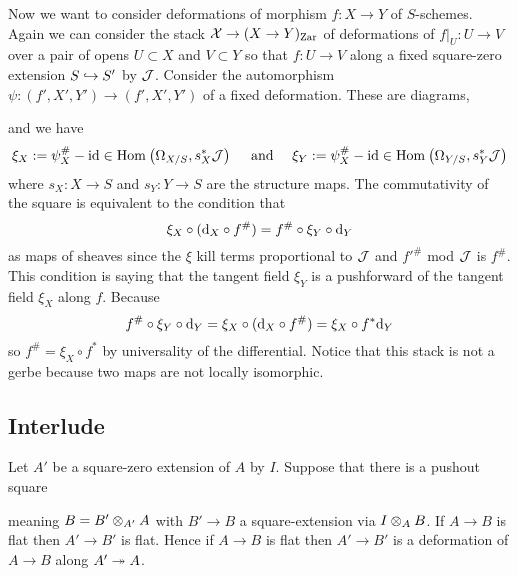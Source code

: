 \documentclass[12pt]{article}
\newcommand{\Zar}{\mathrm{Zar}}
\begin{document}
Now we want to consider deformations of morphism $f : X \to Y$ of $S$-schemes. Again we can consider the stack $\X \to (X \to Y)_{\Zar}$ of deformations of $f|_U : U \to V$ over a pair of opens $U \subset X$ and $V \subset Y$ so that $f : U \to V$ along a fixed square-zero extension $S \hookrightarrow S'$ by $\mathcal{J}$. Consider the automorphism $\psi : (f', X', Y') \to (f', X', Y')$ of a fixed deformation. These are diagrams,
\begin{center}
\end{center}
and we have
\[ \xi_X := \psi^{\#}_X - \mathrm{id} \in \mathrm{Hom}_{} \left( \Omega_{X/S}, s_X^* \mathcal{J} \right) \quad \text{ and } \quad \xi_Y := \psi^{\#}_X - \mathrm{id} \in \mathrm{Hom}_{} \left( \Omega_{Y/S}, s_Y^* \mathcal{J} \right) \]
where $s_X : X \to S$ and $s_Y : Y \to S$ are the structure maps. The commutativity of the square is equivalent to the condition that
\[ \xi_X \circ (\mathrm{d}_X \circ f^{\#}) = f^{\#} \circ \xi_Y \circ \mathrm{d}_Y \]
as maps of sheaves since the $\xi$ kill terms proportional to $\mathcal{J}$ and $f'^{\#}$ mod $\mathcal{J}$ is $f^{\#}$. This condition is saying that the tangent field $\xi_Y$ is a pushforward of the tangent field $\xi_X$ along $f$. Because
\[ f^{\#} \circ \xi_Y \circ \mathrm{d}_Y = \xi_X \circ (\mathrm{d}_X \circ f^{\#}) = \xi_X \circ f^* \mathrm{d}_Y \]
so $f^{\#} = \xi_X \circ f^*$ by universality of the differential. 
Notice that this stack is not a gerbe because two maps are not locally isomorphic. 

\subsection{Interlude}

\begin{prop}
Let $A'$ be a square-zero extension of $A$ by $I$. Suppose that there is a pushout square
\begin{center}
\end{center}
meaning $B = B' \otimes_{A'} A$ with $B' \to B$ a square-extension via $I \otimes_A B$. If $A \to B$ is flat then $A' \to B'$ is flat. Hence if $A \to B$ is flat then $A' \to B'$ is a deformation of $A \to B$ along $A' \twoheadrightarrow A$.
\end{prop}
\end{document}
